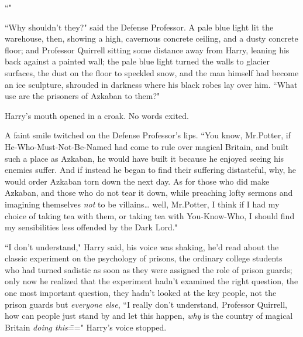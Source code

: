 ``"

``Why shouldn't they?" said the Defense Professor. A pale blue light lit the warehouse, then, showing a high, cavernous concrete ceiling, and a dusty concrete floor; and Professor Quirrell sitting some distance away from Harry, leaning his back against a painted wall; the pale blue light turned the walls to glacier surfaces, the dust on the floor to speckled snow, and the man himself had become an ice sculpture, shrouded in darkness where his black robes lay over him. ``What use are the prisoners of Azkaban to them?"

Harry's mouth opened in a croak. No words exited.

A faint smile twitched on the Defense Professor's lips. ``You know, Mr.\?Potter, if He-Who-Must-Not-Be-Named had come to rule over magical Britain, and built such a place as Azkaban, he would have built it because he enjoyed seeing his enemies suffer. And if instead he began to find their suffering distasteful, why, he would order Azkaban torn down the next day. As for those who did make Azkaban, and those who do not tear it down, while preaching lofty sermons and imagining themselves \emph{not} to be villains{\ldots} well, Mr.\?Potter, I think if I had my choice of taking tea with them, or taking tea with You-Know-Who, I should find my sensibilities less offended by the Dark Lord."

``I don't understand," Harry said, his voice was shaking, he'd read about the classic experiment on the psychology of prisons, the ordinary college students who had turned sadistic as soon as they were assigned the role of prison guards; only now he realized that the experiment hadn't examined the right question, the one most important question, they hadn't looked at the key people, not the prison guards but \emph{everyone else}, ``I really don't understand, Professor Quirrell, how can people just stand by and let this happen, \emph{why} is the country of magical Britain \emph{doing this}\===" Harry's voice stopped.

